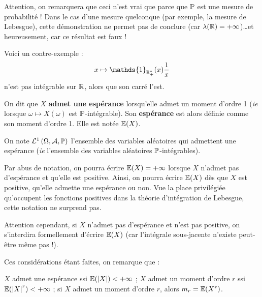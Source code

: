 \documentclass[../integ-proba.tex]{subfiles}
\begin{document}
    \begin{rem}
        \label{rem:warning_moments}
        Attention, on remarquera que ceci n'est vrai que parce que $\mathbb{P}$ est une mesure de probabilité !
        Dans le cas d'une mesure quelconque (par exemple, la mesure de Lebesgue), cette démonstration ne permet pas de conclure (car $\lambda(\mathbb{R}) = +\infty$)\ldots et heureusement, car ce résultat est faux !

        Voici un contre-exemple :
        \begin{displaymath}
          x \mapsto \mathds{1}_{\R_+^*}(x)\frac{1}{x}
        \end{displaymath}
        n'est pas intégrable sur $\mathbb{R}$, alors que son carré l'est.
    \end{rem}

    \begin{defi}
        On dit que $X$ \textbf{admet une espérance} lorsqu'elle admet un moment d'ordre 1 (\textit{ie} lorsque $\omega \mapsto X\left(\omega\right)$ est $\mathbb{P}$-intégrable).
        Son \textbf{espérance} est alors définie comme son moment d'ordre 1.
        Elle est notée $\mathbb{E}(X)$.

        On note $\mathcal{L}^1\left(\Omega, \mathcal{A}, \mathbb{P}\right)$ l'ensemble des variables aléatoires qui admettent une espérance (\textit{ie} l'ensemble des variables aléatoires $\mathbb{P}$-intégrables).
    \end{defi}

    \begin{rem}
        Par abus de notation, on pourra écrire $\mathbb{E}(X)=+\infty$ lorsque $X$ n'admet pas d'espérance et qu'elle est positive.
        Ainsi, on pourra écrire $\mathbb{E}(X)$ dès que $X$ est positive, qu'elle admette une espérance ou non.
        Vue la place privilégiée qu'occupent les fonctions positives dans la théorie d'intégration de Lebesgue, cette notation ne surprend pas.

        Attention cependant, si $X$ n'admet pas d'espérance et n'est pas positive, on s'interdira formellement d'écrire $\mathbb{E}(X)$ (car l'intégrale sous-jacente n'existe peut-être même pas !).
    \end{rem}

    \begin{rem}
        Ces considérations étant faites, on remarque que :
        \begin{itemize}
            \itemb $X$ admet une espérance ssi $\mathbb{E}(\left| X \right|) < +\infty$ ;
            \itemb $X$ admet un moment d'ordre $r$ ssi $\mathbb{E}(\left| X \right|^r) < +\infty$ ;
            \itemb si $X$ admet un moment d'ordre $r$, alors $m_r = \mathbb{E}(X^r)$.
        \end{itemize}
    \end{rem}
\end{document}
